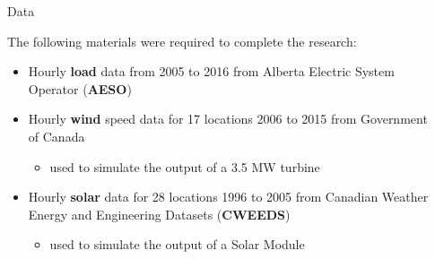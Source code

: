 \documentclass[final]{beamer}
\newlength{\sepwid}
\newlength{\onecolwid}
\newlength{\twocolwid}
\begin{document}
\begin{frame}[t]
\begin{columns}[t]
\begin{column}{\sepwid}\end{column} %

\begin{column}{\twocolwid} %

\begin{columns}[t,totalwidth=\twocolwid] %

\begin{column}{\onecolwid}\vspace{-.6in} %


\begin{block}{Data}

The following materials were required to complete the research:

\begin{itemize}
	
\item Hourly \textbf{load} data from 2005 to 2016 from Alberta Electric System Operator (\textbf{AESO})

\item Hourly \textbf{wind} speed data for 17 locations 2006 to 2015 from Government of Canada

 \begin{itemize}
	\item used to simulate the output of a 3.5 MW turbine
\end{itemize}

\item Hourly \textbf{solar} data for 28 locations 1996 to 2005 from Canadian Weather Energy and Engineering Datasets (\textbf{CWEEDS})

 \begin{itemize}
	\item used to simulate the output of a Solar Module
\end{itemize}

\end{itemize}



\end{block}
\end{column}
\end{columns}
\end{column}
\end{columns}
\end{frame}
\end{document}
